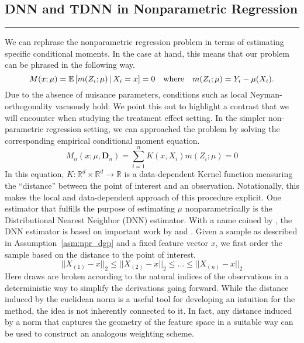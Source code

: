 \subsection{DNN and TDNN in Nonparametric Regression}
\hrule
We can rephrase the nonparametric regression problem in terms of estimating specific conditional moments.
In the case at hand, this means that our problem can be phrased in the following way.
\begin{equation}\label{CondMomEq}
	M(x; \mu)
	= \mathbb{E}\left[m(Z_{i}; \mu) \, | \, X_{i} = x\right]
	= 0
	\quad \text{where} \quad
	m(Z_{i}; \mu) = Y_{i} - \mu(X_{i}).
\end{equation}
Due to the absence of nuisance parameters, conditions such as local Neyman-orthogonality vacuously hold.
We point this out to highlight a contrast that we will encounter when studying the treatment effect setting.
In the simpler non-parametric regression setting, we can approached the problem by solving the corresponding empirical conditional moment equation.
\begin{equation}\label{EmpCondMomEq}
	M_n(x; \mu, \mathbf{D}_n)
	= \sum_{i = 1}^{n}K(x, X_{i})m(Z_{i}; \mu)
	= 0
\end{equation}
In this equation, $K:\mathbb{R}^d \times \mathbb{R}^d \rightarrow \mathbb{R}$ is a data-dependent Kernel function measuring the ``distance'' between the point of interest and an observation.
Notationally, this makes the local and data-dependent approach of this procedure explicit.
One estimator that fulfills the purpose of estimating $\mu$ nonparametrically is the Distributional Nearest Neighbor (DNN) estimator.
With a name coined by \citet{demirkaya_optimal_2024}, the DNN estimator is based on important work by \citet{steele_exact_2009} and \citet{biau_rate_2010}.
Given a sample as described in Assumption~\ref{asm:npr_dgp} and a fixed feature vector $x$, we first order the sample based on the distance to the point of interest.
\begin{equation}\label{eq:ordering}
	||X_{(1)} - x||_2
	\leq ||X_{(2)} - x||_2
	\leq \dotsc
	\leq ||X_{(n)} - x||_2
\end{equation}
Here draws are broken according to the natural indices of the observations in a deterministic way to simplify the derivations going forward.
While the distance induced by the euclidean norm is a useful tool for developing an intuition for the method, the idea is not inherently connected to it.
In fact, any distance induced by a norm that captures the geometry of the feature space in a suitable way can be used to construct an analogous weighting scheme.
